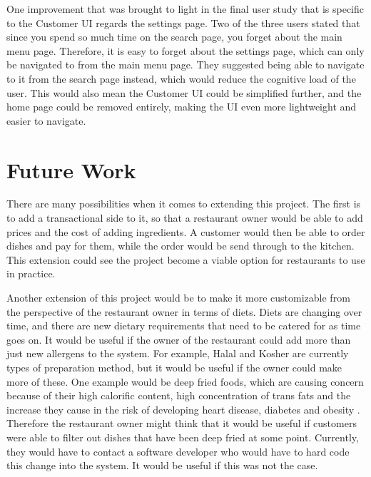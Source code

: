 One improvement that was brought to light in the final user study that is specific to the Customer UI regards the settings page. Two of the three users stated that since you spend so much time on the search page, you forget about the main menu page. Therefore, it is easy to forget about the settings page, which can only be navigated to from the main menu page. They suggested being able to navigate to it from the search page instead, which would reduce the cognitive load of the user. This would also mean the Customer UI could be simplified further, and the home page could be removed entirely, making the UI even more lightweight and easier to navigate.

\section{Future Work}

There are many possibilities when it comes to extending this project. The first is to add a transactional side to it, so that a restaurant owner would be able to add prices and the cost of adding ingredients. A customer would then be able to order dishes and pay for them, while the order would be send through to the kitchen. This extension could see the project become a viable option for restaurants to use in practice. 

Another extension of this project would be to make it more customizable from the perspective of the restaurant owner in terms of diets. Diets are changing over time, and there are new dietary requirements that need to be catered for as time goes on. It would be useful if the owner of the restaurant could add more than just new allergens to the system. For example, Halal and Kosher are currently types of preparation method, but it would be useful if the owner could make more of these. One example would be deep fried foods, which are causing concern because of their high calorific content, high concentration of trans fats and the increase they cause in the risk of developing heart disease, diabetes and obesity \cite{deep_fried_mcdonnell_2023}. Therefore the restaurant owner might think that it would be useful if customers were able to filter out dishes that have been deep fried at some point. Currently, they would have to contact a software developer who would have to hard code this change into the system. It would be useful if this was not the case.

